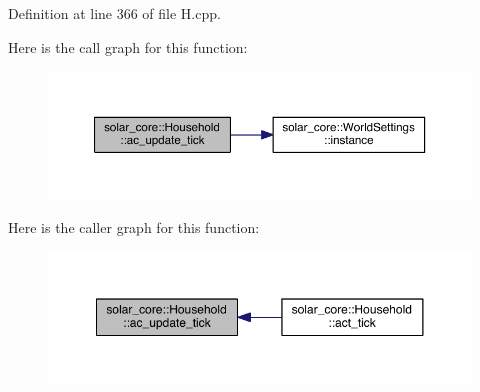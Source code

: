 Definition at line 366 of file H.\+cpp.



Here is the call graph for this function\+:\nopagebreak
\begin{figure}[H]
\begin{center}
\leavevmode
\includegraphics[width=350pt]{classsolar__core_1_1_household_ac73de13d0d4b4e01b2defbb85872c4b2_cgraph}
\end{center}
\end{figure}




Here is the caller graph for this function\+:\nopagebreak
\begin{figure}[H]
\begin{center}
\leavevmode
\includegraphics[width=350pt]{classsolar__core_1_1_household_ac73de13d0d4b4e01b2defbb85872c4b2_icgraph}
\end{center}
\end{figure}


\hypertarget{classsolar__core_1_1_household_a1e7d20a60dc42b8d09a8d23a4cdb26a6}{}
